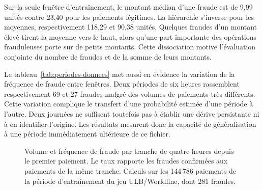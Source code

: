 \documentclass[11pt,a4paper]{article}
\begin{document}
Sur la seule fenêtre d'entraînement, le montant médian d'une fraude est de 9,99 unités contre 23,40 pour les paiements légitimes. La hiérarchie s'inverse pour les moyennes, respectivement 118,29 et 90,38 unités. Quelques fraudes d'un montant élevé tirent la moyenne vers le haut, alors qu'une part importante des opérations frauduleuses porte sur de petits montants. Cette dissociation motive l'évaluation conjointe du nombre de fraudes et de la somme de leurs montants.

Le tableau~\ref{tab:periodes-donnees} met aussi en évidence la variation de la fréquence de fraude entre fenêtres. Deux périodes de six heures rassemblent respectivement 69 et 27 fraudes malgré des volumes de paiements très différents. Cette variation complique le transfert d'une probabilité estimée d'une période à l'autre. Deux journées ne suffisent toutefois pas à établir une dérive persistante ni à en identifier l'origine. Les résultats mesurent donc la capacité de généralisation à une période immédiatement ultérieure de ce fichier.
\begin{figure}[htbp]
\centering
\begingroup
{}
\hfill
{}
\endgroup
\caption{Volume et fréquence de fraude par tranche de quatre heures depuis le premier paiement. Le taux rapporte les fraudes confirmées aux paiements de la même tranche. Calculs sur les 144\,786 paiements de la période d’entraînement du jeu ULB/Worldline, dont 281 fraudes.}
\label{fig:entree}
\end{figure}
\clearpage
\end{document}
